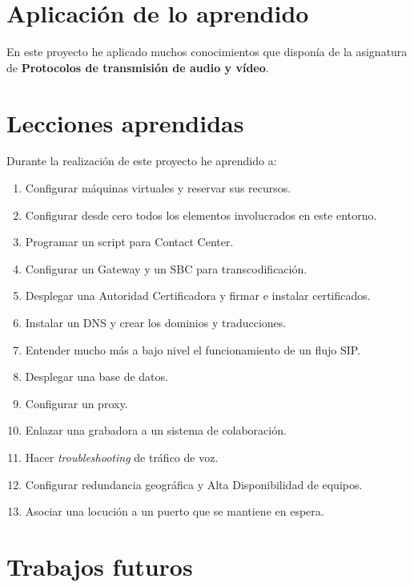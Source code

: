 \documentclass[a4paper, 12pt]{book}
\begin{document}
\section{Aplicación de lo aprendido}
\label{sec:aplicacion}

En este proyecto he aplicado muchos conocimientos que disponía de la asignatura de \textbf{Protocolos de transmisión de audio y vídeo}.

\section{Lecciones aprendidas}
\label{sec:lecciones_aprendidas}

Durante la realización de este proyecto he aprendido a:

\begin{enumerate}
  \item Configurar máquinas virtuales y reservar sus recursos.
  \item Configurar desde cero todos los elementos involucrados en este entorno.
  \item Programar un script para Contact Center.
  \item Configurar un Gateway y un SBC para transcodificación.
  \item Desplegar una Autoridad Certificadora y firmar e instalar certificados.
  \item Instalar un DNS y crear los dominios y traducciones.
  \item Entender mucho más a bajo nivel el funcionamiento de un flujo SIP.
  \item Desplegar una base de datos.
  \item Configurar un proxy.
  \item Enlazar una grabadora a un sistema de colaboración.
  \item Hacer \emph{troubleshooting} de tráfico de voz.
  \item Configurar redundancia geográfica y Alta Disponibilidad de equipos.
  \item Asociar una locución a un puerto que se mantiene en espera.
\end{enumerate}


\section{Trabajos futuros}
\label{sec:trabajos_futuros}
\end{document}
